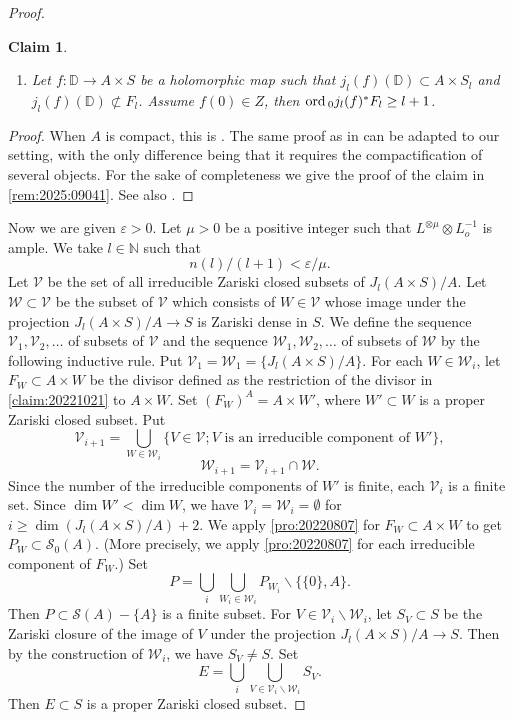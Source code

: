 \documentclass[11pt,english]{smfart}
\theoremstyle{plain}
\newtheorem{claim}[thm]{Claim}
\theoremstyle{definition}
\theoremstyle{remark}
\numberwithin{equation}{section}
\theoremstyle{plain}
\newcommand{\ord}{{\rm ord}\,}
\begin{document}
\begin{proof}
\begin{claim}
\begin{enumerate}
\begin{enumerate}
					\item Let $f:\mathbb D \to A\times S$ be a holomorphic map such that $j_l(f)(\mathbb D )\subset A\times S_l$ and $j_l(f)(\mathbb D )\not\subset F_l$.
					Assume $f(0)\in Z$, then $\ord _{0}j_{l}(f)^*F_l\geq l+1$.
				\end{enumerate}
			\end{enumerate}
		\end{claim}
		
		\begin{proof}
			When $A$ is compact, this is \cite[Prop 6]{Yam15}.	
			The same proof as in \cite[Prop 6]{Yam15} can be adapted to our setting, with the only difference being that it requires the compactification of several objects.
			For the sake of completeness we give the proof of the claim in \cref{rem:2025:09041}.
			See also \cite[Lemma 6.5.42]{NW13}.
		\end{proof}
		
		
		Now we are given $\varepsilon>0$.
		Let $\mu>0$ be a positive integer such that $L^{\otimes\mu}\otimes L_o^{-1}$ is ample.
		We take $l\in\mathbb N$ such that 
		\begin{equation}\label{eqn:201308171}
			n(l)/(l+1)<\varepsilon/\mu .
		\end{equation}
		Let $\mathcal{V}$ be the set of all irreducible Zariski closed subsets of $J_l(A\times S)/A$.
		Let $\mathcal{W}\subset \mathcal{V}$ be the subset of $\mathcal{V}$ which consists of $W\in \mathcal{V}$ whose image under the projection $J_l(A\times S)/A\to S$ is Zariski dense in $S$.
		We define the sequence
		$\mathcal{V}_1, \mathcal{V}_2, \ldots$
		of subsets of $\mathcal{V}$ and the sequence
		$\mathcal{W}_1, \mathcal{W}_2, \ldots$
		of subsets of $\mathcal{W}$
		by the following inductive rule. 
		Put $\mathcal{V}_1 =\mathcal{W}_1= \{ J_l(A\times S)/A\}$. 
		For each $W\in \mathcal{W}_i$, let $F_{W}\subset A\times W$ be the divisor defined as the restriction of the divisor in \cref{claim:20221021} to $A\times W$.
		Set $(F_W)^A=A\times W'$, where $W'\subset W$ is a proper Zariski closed subset.
		Put
		$$
		\mathcal{V}_{i+1}=\bigcup_{W\in \mathcal{W}_i} \{ V\in \mathcal{V};\text{$V$ is an irreducible component of $W'$}\} ,
		$$
		$$
		\mathcal{W}_{i+1}=\mathcal{V}_{i+1}\cap \mathcal{W}.
		$$
		Since the number of the irreducible components of $W'$ is finite,
		each $\mathcal{V}_i$ is a finite set. 
		Since $\dim W'  < \dim W$, we have $\mathcal{V}_i=\mathcal{W}_i = \emptyset$ for
		$i \geq \dim (J_l(A\times S)/A)+2$.
		We apply \cref{pro:20220807} for $F_W\subset A\times W$ to get $P_{W}\subset \mathcal{S}_0(A)$.
		(More precisely, we apply \cref{pro:20220807} for each irreducible component of $F_W$.) 
		Set
		$$
		P=\bigcup_{i}\bigcup_{W_i\in \mathcal{W}_i}P_{W_i}\backslash \{\{0\},A\}.
		$$
		Then $P\subset \mathcal{S}(A)-\{ A\}$ is a finite subset.
		For $V\in \mathcal{V}_i\backslash \mathcal{W}_i$, let $S_{V}\subset S$ be the Zariski closure of the image of $V$ under the projection $J_l(A\times S)/A \to S$.
		Then by the construction of $\mathcal{W}_i$, we have $S_{V}\not= S$.
		Set
		$$
		E=\bigcup_{i}\bigcup_{V\in \mathcal{V}_i\backslash \mathcal{W}_i}S_{V}.
		$$
		Then $E\subset S$ is a proper Zariski closed subset.
		

\end{proof}
\end{document}
